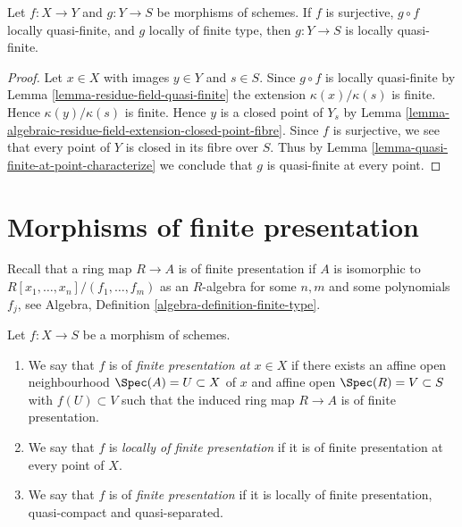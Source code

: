 \begin{lemma}
\label{lemma-quasi-finite-local-source}
Let $f : X \to Y$ and $g : Y \to S$ be morphisms of schemes.
If $f$ is surjective, $g \circ f$ locally quasi-finite, and
$g$ locally of finite type, then $g : Y \to S$  is locally quasi-finite.
\end{lemma}

\begin{proof}
Let $x \in X$ with images $y \in Y$ and $s \in S$.
Since $g \circ f$ is locally quasi-finite by
Lemma \ref{lemma-residue-field-quasi-finite}
the extension $\kappa(x)/\kappa(s)$ is finite.
Hence $\kappa(y)/\kappa(s)$ is finite. Hence
$y$ is a closed point of $Y_s$ by
Lemma \ref{lemma-algebraic-residue-field-extension-closed-point-fibre}.
Since $f$ is surjective, we see that every point of $Y$ is
closed in its fibre over $S$. Thus by
Lemma \ref{lemma-quasi-finite-at-point-characterize}
we conclude that $g$ is quasi-finite at every point.
\end{proof}














\section{Morphisms of finite presentation}
\label{section-finite-presentation}

\noindent
Recall that a ring map $R \to A$ is of finite presentation if
$A$ is isomorphic to $R[x_1, \ldots, x_n]/(f_1, \ldots, f_m)$ as
an $R$-algebra for some $n, m$ and some polynomials $f_j$, see
Algebra, Definition \ref{algebra-definition-finite-type}.

\begin{definition}
\label{definition-finite-presentation}
Let $f : X \to S$ be a morphism of schemes.
\begin{enumerate}
\item We say that $f$ is of {\it finite presentation at $x \in X$} if
there exists an affine open neighbourhood $\Spec(A) = U \subset X$
of $x$ and affine open $\Spec(R) = V \subset S$
with $f(U) \subset V$ such that the induced ring map
$R \to A$ is of finite presentation.
\item We say that $f$ is {\it locally of finite presentation} if it is
of finite presentation at every point of $X$.
\item We say that $f$ is of {\it finite presentation} if it is locally of
finite presentation, quasi-compact and quasi-separated.
\end{enumerate}
\end{definition}

